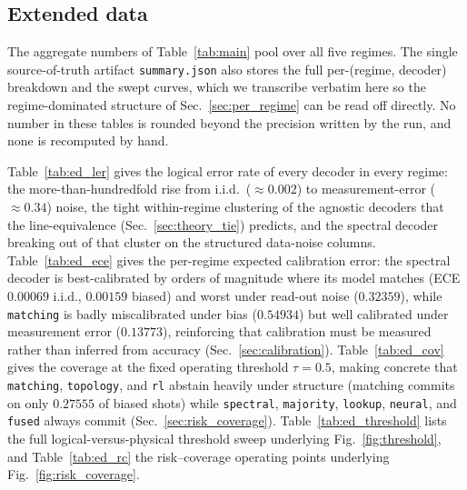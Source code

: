 \documentclass[reprint,aps,prxquantum,amsmath,amssymb,floatfix,nofootinbib,longbibliography]{revtex4-2}
\theoremstyle{definition}
\theoremstyle{remark}
\theoremstyle{plain}
\newcommand{\sync}[1]{#1}
\begin{document}
\subsection{Extended data}
\label{sec:extended_data}

The aggregate numbers of Table~\ref{tab:main} pool over all five regimes. The single source-of-truth artifact \texttt{summary.json} also stores the full per-(regime, decoder) breakdown and the swept curves, which we transcribe verbatim here so the regime-dominated structure of Sec.~\ref{sec:per_regime} can be read off directly. No number in these tables is rounded beyond the precision written by the run, and none is recomputed by hand.

Table~\ref{tab:ed_ler} gives the logical error rate of every decoder in every regime: the more-than-hundredfold rise from i.i.d.\ ($\approx\sync{0.002}$) to measurement-error ($\approx\sync{0.34}$) noise, the tight within-regime clustering of the agnostic decoders that the line-equivalence (Sec.~\ref{sec:theory_tie}) predicts, and the spectral decoder breaking out of that cluster on the structured data-noise columns. Table~\ref{tab:ed_ece} gives the per-regime expected calibration error: the spectral decoder is best-calibrated by orders of magnitude where its model matches (ECE $\sync{0.00069}$ i.i.d., $\sync{0.00159}$ biased) and worst under read-out noise ($\sync{0.32359}$), while \texttt{matching} is badly miscalibrated under bias ($\sync{0.54934}$) but well calibrated under measurement error ($\sync{0.13773}$), reinforcing that calibration must be measured rather than inferred from accuracy (Sec.~\ref{sec:calibration}). Table~\ref{tab:ed_cov} gives the coverage at the fixed operating threshold $\tau=\sync{0.5}$, making concrete that \texttt{matching}, \texttt{topology}, and \texttt{rl} abstain heavily under structure (matching commits on only $\sync{0.27555}$ of biased shots) while \texttt{spectral}, \texttt{majority}, \texttt{lookup}, \texttt{neural}, and \texttt{fused} always commit (Sec.~\ref{sec:risk_coverage}). Table~\ref{tab:ed_threshold} lists the full logical-versus-physical threshold sweep underlying Fig.~\ref{fig:threshold}, and Table~\ref{tab:ed_rc} the risk--coverage operating points underlying Fig.~\ref{fig:risk_coverage}.
\end{document}
